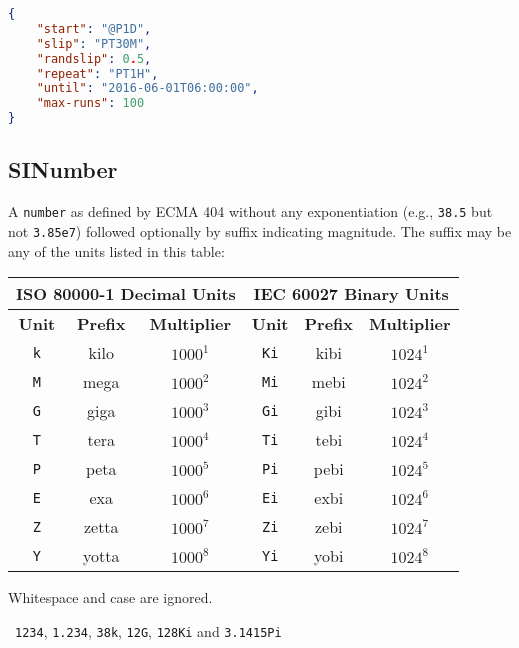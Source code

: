 \documentclass[10pt]{article}
\begin{document}
\example
\begin{lstlisting}[language=json]
{
    "start": "@P1D",
    "slip": "PT30M",
    "randslip": 0.5,
    "repeat": "PT1H",
    "until": "2016-06-01T06:00:00",
    "max-runs": 100
}
\end{lstlisting}


\subsection{SINumber}
A {\tt number} as defined by ECMA 404 without any exponentiation
(e.g., {\tt 38.5} but not {\tt 3.85e7}) followed optionally by suffix
indicating magnitude.  The suffix may be any of the units listed in
this table:

\begin{center}
  \begin{tabular}{|c|c|c|c|c|c|}
    \hline
    \multicolumn{3}{|c}{{\bf ISO 80000-1 Decimal Units}} & \multicolumn{3}{|c|}{{\bf IEC 60027 Binary Units}} \\
    \hline
    {\bf Unit} & {\bf Prefix} & {\bf Multiplier} & {\bf Unit} & {\bf Prefix} & {\bf Multiplier} \\
    \hline
    {\tt k} & kilo & $1000^{1}$ & {\tt Ki} & kibi & $1024^{1}$ \\
    {\tt M} & mega & $1000^{2}$ & {\tt Mi} & mebi & $1024^{2}$ \\
    {\tt G} & giga & $1000^{3}$ & {\tt Gi} & gibi & $1024^{3}$ \\
    {\tt T} & tera & $1000^{4}$ & {\tt Ti} & tebi & $1024^{4}$ \\
    {\tt P} & peta & $1000^{5}$ & {\tt Pi} & pebi & $1024^{5}$ \\
    {\tt E} & exa & $1000^{6}$ & {\tt Ei} & exbi & $1024^{6}$ \\
    {\tt Z} & zetta & $1000^{7}$ & {\tt Zi} & zebi & $1024^{7}$ \\
    {\tt Y} & yotta & $1000^{8}$ & {\tt Yi} & yobi & $1024^{8}$ \\
    \hline
  \end{tabular}
\end{center}

Whitespace and case are ignored.

\example\ {\tt 1234},  {\tt 1.234}, {\tt 38k}, {\tt 12G}, {\tt 128Ki} and {\tt 3.1415Pi}

\\
\\
\end{document}
